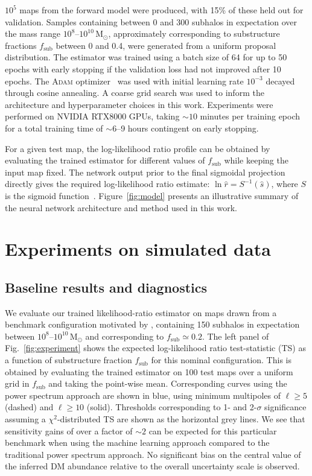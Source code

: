 \documentclass[twocolumn]{aastex631}
\begin{document}
$10^5$ maps from the forward model were produced, with 15\% of these held out for validation. {Samples containing between 0 and 300 subhalos in expectation over the mass range $10^{8}$--$10^{10}\,\mathrm{M}_\odot$, approximately corresponding to substructure fractions $f_\mathrm{sub}$ between 0 and 0.4, were generated from a uniform proposal distribution.} The estimator was trained using a batch size of 64 for up to 50 epochs with early stopping if the validation loss had not improved after 10 epochs. The \textsc{Adam} optimizer~\citep{kingma2017adam} was used with initial learning rate $10^{-3}$ decayed through cosine annealing. A coarse grid search was used to inform the architecture and hyperparameter choices in this work. {Experiments were performed on NVIDIA RTX8000 GPUs, taking $\sim10$ minutes per training epoch for a total training time of $\sim6$--9 hours contingent on early stopping.}

For a given test map, the log-likelihood ratio profile can be obtained by evaluating the trained estimator for different values of $f_\mathrm{sub}$ while keeping the input map fixed. The network output prior to the final sigmoidal projection directly gives the required log-likelihood ratio estimate: $\ln\hat r = S^{-1}(\hat s)$, where $S$ is the sigmoid function~\citep{Hermans:2019ioj,Hermans:2020skz}.
Figure~\ref{fig:model} presents an illustrative summary of the neural network architecture and method used in this work. \vspace{0.5cm}

\section{Experiments on simulated data}
\label{sec:experiments}

\subsection{Baseline results and diagnostics}
\label{sec:baseline}

We evaluate our trained likelihood-ratio estimator on maps drawn from a benchmark configuration motivated by \citet{Hutten:2016jko,Springel:2008cc}, containing 150 subhalos in expectation between $10^{8}$--$10^{10}\,\mathrm{M}_\odot$ and corresponding to $f_\mathrm{sub} \simeq 0.2$. The left panel of Fig.~\ref{fig:experiment} shows the expected log-likelihood ratio test-statistic (TS) as a function of substructure fraction $f_\mathrm{sub}$ for this nominal configuration. This is obtained by evaluating the trained estimator on 100 test maps over a uniform grid in $f_\mathrm{sub}$ and taking the point-wise mean. Corresponding curves using the power spectrum approach are shown in blue, using minimum multipoles of $\ell \geq 5$ (dashed) and $\ell \geq 10$ (solid). Thresholds corresponding to 1- and 2-$\sigma$ significance assuming a $\chi^2$-distributed TS are shown as the horizontal grey lines. We see that sensitivity gains of over a factor of $\sim 2$ can be expected for this particular benchmark when using the machine learning approach compared to the traditional power spectrum approach. No significant bias on the central value of the inferred DM abundance relative to the overall uncertainty scale is observed.
\end{document}
